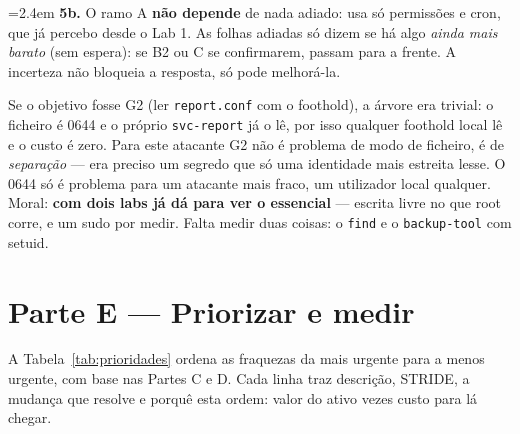 \documentclass[a4paper,11pt]{article}
\newenvironment{answer}[1]{%
  \par\addvspace{7pt}\noindent
  \hangindent=2.4em\hangafter=1
  {\color{sscnblue}\bfseries #1\hspace{0.55em}}\ignorespaces}
  {\par\addvspace{5pt}}
\newcommand{\cmd}[1]{\textcolor{sscnblue}{\texttt{#1}}}
\begin{document}
\begin{answer}{5b.}
O ramo A \textbf{n\~ao depende} de nada adiado: usa s\'o permiss\~oes e cron, que j\'a
percebo desde o Lab 1. As folhas adiadas s\'o dizem se h\'a algo \emph{ainda mais
barato} (sem espera): se B2 ou C se confirmarem, passam para a frente. A
incerteza n\~ao bloqueia a resposta, s\'o pode melhor\'a-la.

Se o objetivo fosse G2 (ler \cmd{report.conf} com o foothold), a \'arvore era
trivial: o ficheiro \'e 0644 e o pr\'oprio \texttt{svc-report} j\'a o l\^e, por isso
qualquer foothold local l\^e e o custo \'e zero. Para este atacante G2 n\~ao \'e
problema de modo de ficheiro, \'e de \emph{separa\c{c}\~ao} --- era preciso um segredo
que s\'o uma identidade mais estreita lesse. O 0644 s\'o \'e problema para um
atacante mais fraco, um utilizador local qualquer. Moral: \textbf{com dois labs j\'a
d\'a para ver o essencial} --- escrita livre no que root corre, e um sudo por medir.
Falta medir duas coisas: o \cmd{find} e o \cmd{backup-tool} com setuid.
\end{answer}

\section{Parte E --- Priorizar e medir}
A Tabela~\ref{tab:prioridades} ordena as fraquezas da mais urgente para a menos
urgente, com base nas Partes C e D. Cada linha traz descri\c{c}\~{a}o, STRIDE,
a mudan\c{c}a que resolve e porqu\^e esta ordem: valor do ativo vezes custo para
l\'a chegar.
\end{document}
